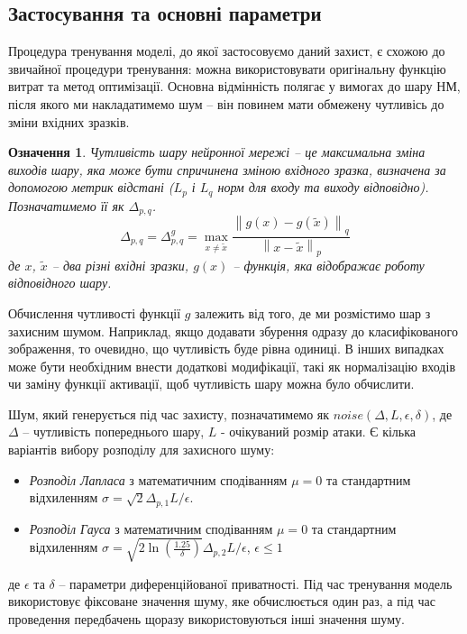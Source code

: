 \documentclass[14pt,a4paper]{extarticle}
\newcounter{e}
\newtheorem{defn}[theorem]{Означення}
\numberwithin{equation}{section}
\numberwithin{figure}{section}
\begin{document}
 \subsection{Застосування та основні параметри}
 Процедура тренування моделі, до якої застосовуємо даний захист, є схожою до звичайної процедури тренування: можна використовувати оригінальну функцію витрат та метод оптимізації. Основна відмінність полягає у вимогах до шару НМ, після якого ми накладатимемо шум -- він повинем мати обмежену чутливісь до зміни вхідних зразків.
 
 \begin{defn} Чутливість шару нейронної мережі -- це максимальна зміна виходів шару, яка може бути спричинена зміною вхідного зразка, визначена за допомогою метрик відстані ($L_p$ і $L_q$ норм для входу та виходу відповідно). Позначатимемо її як $\Delta_{p, q}$.
 \begin{equation}
 	\label{sensitivity}
 	\Delta_{p, q}=\Delta_{p, q}^{g}=\max _{x \neq \tilde{x}} \frac{\left\|g(x)-g\left(\tilde{x}\right)\right\|_{q}}{\left\|x-\tilde{x}\right\|_{p}}
 \end{equation}
 де $x$, $\tilde{x}$ -- два різні вхідні зразки, $g(x)$ -- функція, яка відображає роботу відповідного шару.
 \end{defn}
 
 Обчислення чутливості функції $g$ залежить від того, де ми розмістимо шар з захисним шумом. Наприклад, якщо додавати збурення одразу до класифікованого зображення, то очевидно, що чутливість буде рівна одиниці. В інших випадках може бути необхідним внести додаткові модифікації, такі як нормалізацію входів чи заміну функції активації, щоб чутливість шару можна було обчислити.
 
 Шум, який генерується під час захисту, позначатимемо як $noise(\Delta, L, \epsilon, \delta)$, де $\Delta$ -- чутливість попереднього шару, $L$ - очікуваний розмір атаки. Є кілька варіантів вибору розподілу для захисного шуму:
 \begin{itemize}
 	\item \textit{Розподіл Лапласа} з математичним сподіванням $\mu = 0$ та стандартним відхиленням $\sigma=\sqrt{2} \Delta_{p, 1} L / \epsilon$. 
 	\item \textit{Розподіл Гауса} з математичним сподіванням $\mu = 0$ та стандартним відхиленням $\sigma=\sqrt{2 \ln \left(\frac{1.25}{\delta}\right)} \Delta_{p, 2} L / \epsilon$, $\epsilon \leq 1$
 \end{itemize}
 де $\epsilon$ та $\delta$ -- параметри диференційованої приватності. Під час тренування модель використовує фіксоване значення шуму, яке обчислюється один раз, а під час проведення передбачень щоразу використовуються інші значення шуму.
 
\end{document}
